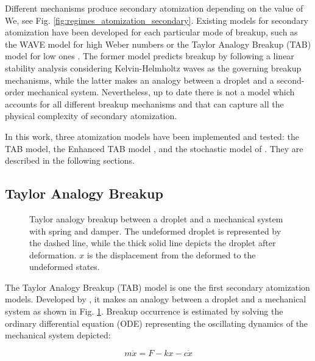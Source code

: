 Different mechanisms produce secondary atomization depending on the value of We, see Fig. \ref{fig:regimes_atomization_secondary}. Existing models for secondary atomization have been developed for each particular mode of breakup, such as the WAVE model for high Weber numbers  or the Taylor Analogy Breakup (TAB) model for low ones . The former model predicts breakup by following a linear stability analysis considering Kelvin-Helmholtz waves as the governing breakup mechanisms, while the latter makes an analogy between a droplet and a second-order mechanical system. Nevertheless, up to date there is not a model which accounts for all different breakup mechanisms and that can capture all the physical complexity of secondary atomization.

In this work, three atomization models have been implemented and tested: the TAB model, the Enhanced TAB model , and the stochastic model of . They are described in the following sections.

\subsection{Taylor Analogy Breakup}


\begin{figure}[h!]
	\centering
	\caption{Taylor analogy breakup between a droplet and a mechanical system with spring and damper. The undeformed droplet is represented by the dashed line, while the thick solid line depicts the droplet after deformation. $x$ is the displacement from the deformed to the undeformed states.}
	\label{fig:TAB_droplet_deformation}
\end{figure}

The Taylor Analogy Breakup (TAB) model is one the first secondary atomization models. Developed by , it makes an analogy between a droplet and a mechanical system as shown in Fig. \ref{fig:TAB_droplet_deformation}. Breakup occurrence is estimated by solving the ordinary differential equation (ODE) representing the oscillating dynamics of the mechanical system depicted:

\begin{equation}
\label{ref:TAB_ODE_x}
m \ddot{x} = F - k x - c \dot{x}
\end{equation}

